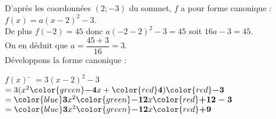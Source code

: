 \documentclass[a4paper,11pt,exos]{nsi} %
\begin{document}
D'après les coordonnées $(2;-3)$ du sommet, $f$ a pour forme canonique : $f(x)=a(x-2)^2-3$.\\
De plus $f(-2)=45$ donc $a(-2-2)^2-3=45$ soit $16a -3=45$.\\
On en déduit que $a=\dfrac{45+3}{16}=3$.\\
Développons la forme canonique :
\begin{tabbing}
    $f(x)$  \= $ =3(x-2)^2-3$\\
    \>  $=3(x^2{\color{green}\boldsymbol{-4}}x+{\color{red}\boldsymbol{4}}){\color{red}\boldsymbol{-3}}$\\
    \>  $={\color{blue}\boldsymbol{3}}x^2{\color{green}\boldsymbol{-12}}x{\color{red}\boldsymbol{+12-3}}$\\
    \>  $={\color{blue}\boldsymbol{3}}x^2{\color{green}\boldsymbol{-12}}x{\color{red}\boldsymbol{+9}}$
\end{tabbing} 
  
\end{document}

